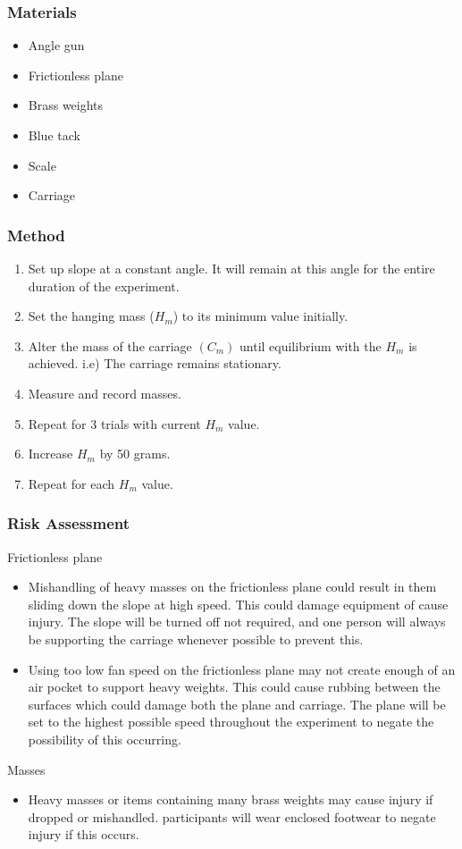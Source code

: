 \documentclass[11pt,a4paper]{article}
\begin{document}
\subsubsection{Materials}
\begin{itemize}
	\item Angle gun 
	\item Frictionless plane
	\item Brass weights
	\item Blue tack 
	\item Scale
	\item Carriage
\end{itemize}

\subsubsection{Method}
\begin{enumerate}
\item Set up slope at a constant angle. It will remain at this angle for the entire duration of the experiment. 
\item Set the hanging mass ($H_m$) to its minimum value initially.
\item Alter the mass of the carriage $(C_m)$ until equilibrium with the $H_m$ is achieved. i.e) The carriage remains stationary. 
\item Measure and record masses. 
\item Repeat for 3 trials with current $H_m$ value.
\item Increase $H_m$ by 50 grams. 
\item Repeat for each $H_m$ value.
\end{enumerate}


\subsubsection{Risk Assessment}
Frictionless plane
\begin{itemize}
	\item Mishandling of heavy masses on the frictionless plane could result in them sliding down the slope at high speed. This could damage equipment of cause injury. The slope will be turned off not required, and one person will always be supporting the carriage whenever possible to prevent this. 
	\item Using too low fan speed on the frictionless plane may not create enough of an air pocket to support heavy weights. This could cause rubbing between the surfaces which could damage both the plane and carriage. The plane will be set to the highest possible speed throughout the experiment to negate the possibility of this occurring.
\end{itemize}
Masses
\begin{itemize}
	\item Heavy masses or items containing many brass weights may cause injury if dropped or mishandled. participants will wear enclosed footwear to negate injury if this occurs.  
\end{itemize}
\end{document}

